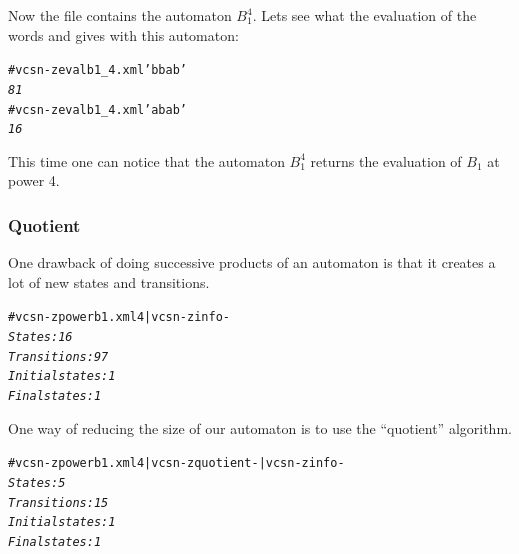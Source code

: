 Now the file  contains the automaton $B_1^4$. Lets see
what the evaluation of the words  and  gives
with this automaton:

\begin{alltt}
# vcsn-z eval b1_4.xml 'bbab'
\textit{81}
# vcsn-z eval b1_4.xml 'abab'
\textit{16}
\end{alltt}

This time one can notice that the automaton $B_1^4$ returns the
evaluation of $B_1$ at power 4.

\subsubsection{Quotient}

One drawback of doing successive products of an automaton is
that it creates a lot of new states and transitions.
\begin{alltt}
# vcsn-z power b1.xml 4 | vcsn-z info -
\textit{States: 16}
\textit{Transitions: 97}
\textit{Initial states: 1}
\textit{Final states: 1}
\end{alltt}
One way of reducing the size of our automaton is to use the
``quotient'' algorithm.
\begin{alltt}
# vcsn-z power b1.xml 4 | vcsn-z quotient - | vcsn-z info -
\textit{States: 5}
\textit{Transitions: 15}
\textit{Initial states: 1}
\textit{Final states: 1}
\end{alltt}

